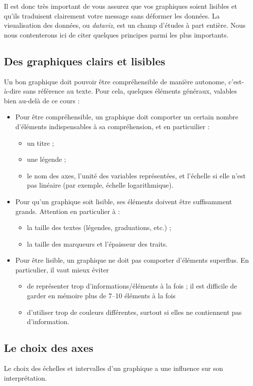 Il est donc très important de vous assurez que vos graphiques soient lisibles
et qu'ils traduisent clairement votre message sans déformer les données. La
visualisation des données, ou \textit{dataviz}, est un champ d'études à part
entière.  Nous nous contenterons ici de citer quelques principes parmi les plus
importants.

\subsection{Des graphiques clairs et lisibles}
Un bon graphique doit pouvoir être compréhensible de manière autonome,
c'est-à-dire sans référence au texte. Pour cela, quelques éléments généraux,
valables bien au-delà de ce cours :
\begin{itemize}
\item Pour être compréhensible, un graphique doit comporter un certain nombre
  d'éléments indispensables à sa compréhension, et en particuilier :
  \begin{itemize}
  \item un titre ;
  \item une légende ;
  \item le nom des axes, l'unité des variables représentées, et l'échelle si
    elle n'est pas linéaire (par exemple, échelle logarithmique).
  \end{itemize}
\item Pour qu'un graphique soit lisible, ses éléments doivent être suffisamment
  grands. Attention en particulier à :
  \begin{itemize}
  \item la taille des textes (légendes, graduations, etc.) ;
  \item la taille des marqueurs et l'épaisseur des traits.
  \end{itemize}
\item Pour être lisible, un graphique ne doit pas comporter d'éléments
  superflus. En particulier, il vaut mieux éviter
  \begin{itemize}
  \item de représenter trop d'informations/éléments à la fois ;
    il est difficile de garder en mémoire plus de 7--10 éléments à la fois
  \item d'utiliser trop de couleurs différentes, surtout si elles ne
    contiennent pas d'information.
  \end{itemize}
\end{itemize}

\subsection{Le choix des axes}
Le choix des échelles et intervalles d'un graphique a une influence sur son
interprétation.

